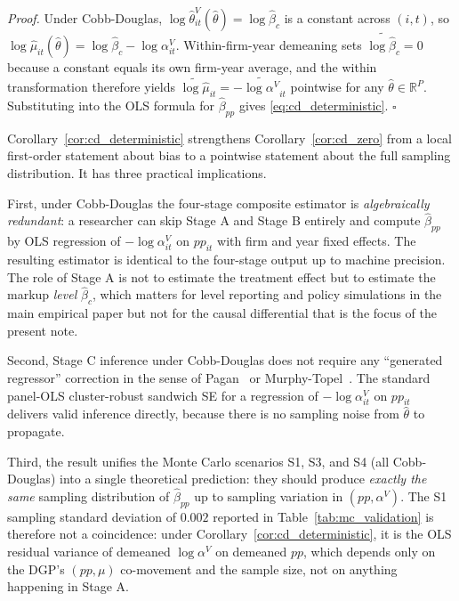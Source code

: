 \documentclass[11pt]{article}
\begin{document}
\emph{Proof.} Under Cobb-Douglas, $\log\hat\theta^V_{it}(\hat\theta) = \log\hat\beta_c$ is a constant across $(i,t)$, so $\log\hat\mu_{it}(\hat\theta) = \log\hat\beta_c - \log\alpha^V_{it}$. Within-firm-year demeaning sets $\widetilde{\log\hat\beta_c} = 0$ because a constant equals its own firm-year average, and the within transformation therefore yields $\widetilde{\log\hat\mu}_{it} = -\widetilde{\log\alpha^V}_{it}$ pointwise for any $\hat\theta \in \mathbb{R}^P$. Substituting into the OLS formula for $\hat\beta_{pp}$ gives \eqref{eq:cd_deterministic}. $\square$

Corollary~\ref{cor:cd_deterministic} strengthens Corollary~\ref{cor:cd_zero} from a local first-order statement about bias to a pointwise statement about the full sampling distribution. It has three practical implications.

First, under Cobb-Douglas the four-stage composite estimator is \emph{algebraically redundant}: a researcher can skip Stage A and Stage B entirely and compute $\hat\beta_{pp}$ by OLS regression of $-\log\alpha^V_{it}$ on $pp_{it}$ with firm and year fixed effects. The resulting estimator is identical to the four-stage output up to machine precision. The role of Stage A is not to estimate the treatment effect but to estimate the markup \emph{level} $\hat\beta_c$, which matters for level reporting and policy simulations in the main empirical paper but not for the causal differential that is the focus of the present note.

Second, Stage C inference under Cobb-Douglas does not require any ``generated regressor'' correction in the sense of Pagan~\cite{Pagan1984} or Murphy-Topel~\cite{MurphyTopel1985}. The standard panel-OLS cluster-robust sandwich SE for a regression of $-\log\alpha^V_{it}$ on $pp_{it}$ delivers valid inference directly, because there is no sampling noise from $\hat\theta$ to propagate.

Third, the result unifies the Monte Carlo scenarios S1, S3, and S4 (all Cobb-Douglas) into a single theoretical prediction: they should produce \emph{exactly the same} sampling distribution of $\hat\beta_{pp}$ up to sampling variation in $(pp, \alpha^V)$. The S1 sampling standard deviation of $0.002$ reported in Table~\ref{tab:mc_validation} is therefore not a coincidence: under Corollary~\ref{cor:cd_deterministic}, it is the OLS residual variance of demeaned $\log\alpha^V$ on demeaned $pp$, which depends only on the DGP's $(pp, \mu)$ co-movement and the sample size, not on anything happening in Stage A.
\end{document}

